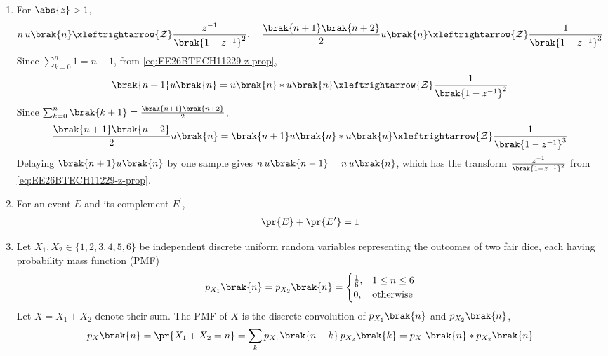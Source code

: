 \begin{enumerate}[label=\thesubsection.\arabic*, ref=\thesubsection.\theenumi]
Since $\sum_{k=0}^{n} x\brak{k} = x\brak{n} * u\brak{n}$, the running sum satisfies
\begin{align}
	\sum_{k=0}^{n} x\brak{k} \xleftrightarrow{\mathcal{Z}} \frac{X\brak{z}}{1 - z^{-1}}
\end{align}
\item For $\abs{z} > 1$,
\begin{align}
	n\,u\brak{n} \xleftrightarrow{\mathcal{Z}} \frac{z^{-1}}{\brak{1 - z^{-1}}^2}, \quad
	\frac{\brak{n+1}\brak{n+2}}{2}u\brak{n} \xleftrightarrow{\mathcal{Z}} \frac{1}{\brak{1 - z^{-1}}^3}
	\label{eq:EE26BTECH11229-z-pairs}
\end{align}
\solution
Since $\sum_{k=0}^{n} 1 = n + 1$, from \eqref{eq:EE26BTECH11229-z-prop},
\begin{align}
	\brak{n+1}u\brak{n} = u\brak{n} * u\brak{n} \xleftrightarrow{\mathcal{Z}} \frac{1}{\brak{1 - z^{-1}}^2}
\end{align}
Since $\sum_{k=0}^{n} \brak{k+1} = \frac{\brak{n+1}\brak{n+2}}{2}$,
\begin{align}
	\frac{\brak{n+1}\brak{n+2}}{2}u\brak{n} = \brak{n+1}u\brak{n} * u\brak{n} \xleftrightarrow{\mathcal{Z}} \frac{1}{\brak{1 - z^{-1}}^3}
\end{align}
Delaying $\brak{n+1}u\brak{n}$ by one sample gives $n\,u\brak{n-1} = n\,u\brak{n}$, which has the transform $\frac{z^{-1}}{\brak{1 - z^{-1}}^2}$ from \eqref{eq:EE26BTECH11229-z-prop}.
\item For an event $E$ and its complement $E^{\prime}$,
\begin{align}
	\pr{E} + \pr{E^{\prime}} = 1
	\label{eq:EE26BTECH11229-prob-def}
\end{align}
\item Let $X_1, X_2 \in \{1, 2, 3, 4, 5, 6\}$ be independent discrete uniform random variables representing the outcomes of two fair dice, each having probability mass function (PMF)
\begin{align}
	p_{X_1}\brak{n} = p_{X_2}\brak{n} =
	\begin{cases}
		\frac{1}{6}, & 1 \le n \le 6
		\\
		0, & \text{otherwise}
	\end{cases}
	\label{eq:EE26BTECH11229-dice-uniform}
\end{align}
Let $X = X_1 + X_2$ denote their sum. The PMF of $X$ is the discrete convolution of $p_{X_1}\brak{n}$ and $p_{X_2}\brak{n}$,
\begin{align}
	p_X\brak{n} = \pr{X_1 + X_2 = n} = \sum_{k} p_{X_1}\brak{n-k}\, p_{X_2}\brak{k} = p_{X_1}\brak{n} * p_{X_2}\brak{n}

\end{align}
\end{enumerate}
